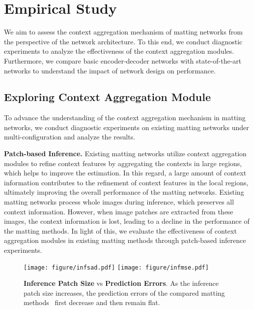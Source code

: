\documentclass[10pt,twocolumn,letterpaper]{article}
\begin{document}
\section{Empirical Study}
We aim to assess the context aggregation mechanism of matting networks from the perspective of the network architecture.
To this end, we conduct diagnostic experiments to analyze the effectiveness of the context aggregation modules.
Furthermore, we compare basic encoder-decoder networks with state-of-the-art networks to understand the impact of network design on performance.


\subsection{Exploring Context Aggregation Module}
To advance the understanding of the context aggregation mechanism in matting networks, 
we conduct diagnostic experiments on existing matting networks under multi-configuration and analyze the results.

\noindent \textbf{Patch-based Inference.}
Existing matting networks utilize context aggregation modules to refine context features by aggregating the contexts in large regions, which helps to improve the estimation.
In this regard, a large amount of context information contributes to the refinement of context features in the local regions, ultimately improving the overall performance of the matting networks.
Existing matting networks process whole images during inference, which preserves all context information. 
However, when image patches are extracted from these images, the context information is lost, leading to a decline in the performance of the matting methods.
In light of this,  we evaluate the effectiveness of context aggregation modules in existing matting methods through patch-based inference experiments.

\begin{figure}[!t]
    \begin{center}
    \texttt{[image: figure/infsad.pdf]}
    \texttt{[image: figure/infmse.pdf]}
    \end{center}
    \caption{  \textbf{Inference Patch Size} vs \textbf{Prediction Errors}. As the inference patch size increases, the prediction errors of the compared matting methods~\cite{lu2019indices,li2020natural,Liu_2021_ICCV,forte2020fbamatting,park2022matteformer} first decrease and then remain flat. }
\label{fig:pvse}
\end{figure}
\end{document}
